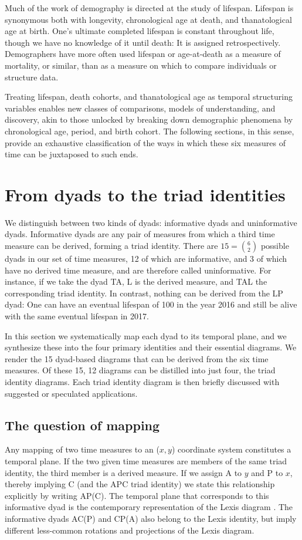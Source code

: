 \documentclass{bmcart}
\theoremstyle{definition}
\begin{document}
Much of the work of demography is directed at the study of lifespan. Lifespan is
synonymous both with longevity, chronological age at death, and thanatological
age at birth. One's ultimate completed lifespan is constant throughout life,
though we have no knowledge of it until death: It is assigned retrospectively.
Demographers have more often used lifespan or age-at-death as a measure of
mortality, or similar, than as a measure on which to compare individuals or
structure data.

Treating lifespan,
death cohorts, and thanatological age as temporal structuring variables
enables new classes of comparisons, models of understanding, and discovery,
akin to those unlocked by breaking down demographic phenomena by chronological age,
period, and birth cohort. The following sections, in this sense, provide an
exhaustive classification of the ways in which these six measures of time can be juxtaposed to such ends.


\section{From dyads to the triad identities}
\label{sec:dyads2diagrams}
We distinguish between two kinds of dyads: informative dyads and uninformative dyads. Informative dyads are any pair of measures from which a third time measure
can be derived, forming a triad identity. There are
$15=\binom{6}{2}$ possible dyads in our set of time measures, 12 of which are
informative, and 3 of which have no derived time measure, and are therefore
called uninformative. For instance, if we take the dyad TA, L is the derived
measure, and TAL the corresponding triad identity. In
contrast, nothing can be derived from the LP dyad: One can have an eventual
lifespan of 100 in the year 2016 and still be alive with the same eventual lifespan in 2017.

In this section we systematically map each dyad to its temporal plane, and we
synthesize these into the four primary identities and their essential diagrams.
We render the 15 dyad-based diagrams that can be derived from the six time
measures. Of these 15, 12 diagrams can be distilled into just four, the triad identity diagrams. Each triad identity diagram is then briefly discussed with suggested or speculated
applications.

\subsection{The question of mapping}
Any mapping of two time measures to an ($x,y$) coordinate
system constitutes a temporal plane. If the two given time measures are members of the same triad identity, the third member is a derived
measure. If we assign A to $y$ and P to $x$, thereby implying C (and the APC
triad identity) we state this relationship explicitly by writing
AP(C).
The temporal plane that corresponds to this informative dyad is the contemporary representation of the
Lexis diagram \citep{lexis1875einleitung, pressat1961analyse}. The informative
dyads AC(P) and CP(A) also belong to the Lexis identity, but imply different
less-common rotations and projections of the Lexis diagram.
\end{document}
